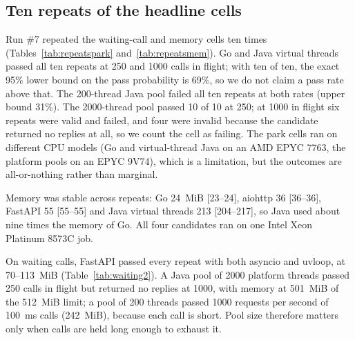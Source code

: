 \documentclass[journal]{IEEEtran}
\begin{document}
\subsection{Ten repeats of the headline cells}\label{sec:repeats}

Run \#7 repeated the waiting-call and memory cells ten times (Tables~\ref{tab:repeatspark} and~\ref{tab:repeatsmem}). Go and Java virtual threads passed all ten repeats at 250 and 1000 calls in flight; with ten of ten, the exact 95\% lower bound on the pass probability is 69\%, so we do not claim a pass rate above that. The 200-thread Java pool failed all ten repeats at both rates (upper bound 31\%). The 2000-thread pool passed 10 of 10 at 250; at 1000 in flight six repeats were valid and failed, and four were invalid because the candidate returned no replies at all, so we count the cell as failing. The park cells ran on different CPU models (Go and virtual-thread Java on an AMD EPYC 7763, the platform pools on an EPYC 9V74), which is a limitation, but the outcomes are all-or-nothing rather than marginal.

Memory was stable across repeats: Go 24~MiB [23--24], aiohttp 36 [36--36], FastAPI 55 [55--55] and Java virtual threads 213 [204--217], so Java used about nine times the memory of Go. All four candidates ran on one Intel Xeon Platinum 8573C job.

On waiting calls, FastAPI passed every repeat with both asyncio and uvloop, at 70--113~MiB (Table~\ref{tab:waiting2}). A Java pool of 2000 platform threads passed 250 calls in flight but returned no replies at 1000, with memory at 501~MiB of the 512~MiB limit; a pool of 200 threads passed 1000 requests per second of 100~ms calls (242~MiB), because each call is short. Pool size therefore matters only when calls are held long enough to exhaust it.
\end{document}
